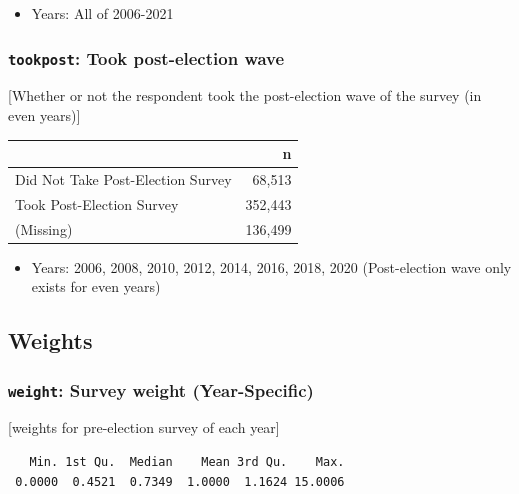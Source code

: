 \documentclass[10pt,article,oneside]{memoir}
\theoremstyle{definition}
\begin{document}
\begin{itemize}
\tightlist
\item
  Years: All of 2006-2021
\end{itemize}

\hypertarget{tookpost-took-post-election-wave}{%
\subsubsection{\texorpdfstring{\texttt{tookpost}: Took post-election
wave}{tookpost: Took post-election wave}}\label{tookpost-took-post-election-wave}}

{[}Whether or not the respondent took the post-election wave of the
survey (in even years){]}

\begin{table}[H]
\centering
\begin{tabular}[t]{lr}
\toprule
 & n\\
\midrule
Did Not Take Post-Election Survey & 68,513\\
Took Post-Election Survey & 352,443\\
(Missing) & 136,499\\
\bottomrule
\end{tabular}
\end{table}

\begin{itemize}
\tightlist
\item
  Years: 2006, 2008, 2010, 2012, 2014, 2016, 2018, 2020 (Post-election
  wave only exists for even years)
\end{itemize}

\hypertarget{weights}{%
\subsection{Weights}\label{weights}}

\hypertarget{weight-survey-weight-year-specific}{%
\subsubsection{\texorpdfstring{\texttt{weight}: Survey weight
(Year-Specific)}{weight: Survey weight (Year-Specific)}}\label{weight-survey-weight-year-specific}}

{[}weights for pre-election survey of each year{]}

\begin{verbatim}
   Min. 1st Qu.  Median    Mean 3rd Qu.    Max. 
 0.0000  0.4521  0.7349  1.0000  1.1624 15.0006 
\end{verbatim}
\end{document}
